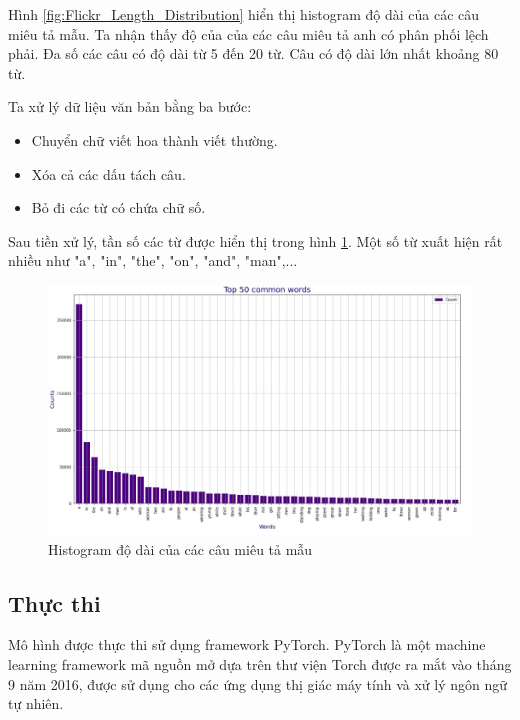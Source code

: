 \documentclass[14pt, a4paper]{article}
\numberwithin{equation}{section}
\numberwithin{algorithm}{section}
\numberwithin{figure}{section}
\numberwithin{dl}{section}
\numberwithin{md}{section}
\numberwithin{bd}{section}
\numberwithin{dn}{section}
\numberwithin{hq}{section}
\begin{document}
    Hình \ref{fig:Flickr_Length_Distribution} hiển thị histogram độ dài của các câu miêu tả mẫu.
    Ta nhận thấy độ của của các câu miêu tả anh có phân phối lệch phải. Đa số các câu có độ dài từ 5 đến 20 từ.
    Câu có độ dài lớn nhất khoảng 80 từ.

    Ta xử lý dữ liệu văn bản bằng ba bước:

    \begin{itemize}
        \item Chuyển chữ viết hoa thành viết thường.
        \item Xóa cả các dấu tách câu.
        \item Bỏ đi các từ có chứa chữ số.
    \end{itemize}

    Sau tiền xử lý, tần số các từ được hiển thị trong hình \ref{fig:Flickr_frequency_processed_word}. Một số từ xuất hiện rất nhiều như "a", "in", "the", "on", "and", "man",...

    \begin{figure}[h!] \centering

        \includegraphics[scale=0.5]{Flickr_frequency_processed_word.jpg}
        \caption{Histogram độ dài của các câu miêu tả mẫu}
        \label{fig:Flickr_frequency_processed_word}

    \end{figure}

    \subsection{Thực thi}

    Mô hình được thực thi sử dụng framework PyTorch. 
    PyTorch là một machine learning framework mã nguồn mở dựa trên thư viện Torch được ra mắt vào tháng 9 năm 2016, được sử dụng cho các ứng dụng thị giác máy tính và xử lý ngôn ngữ tự nhiên.
\end{document}
